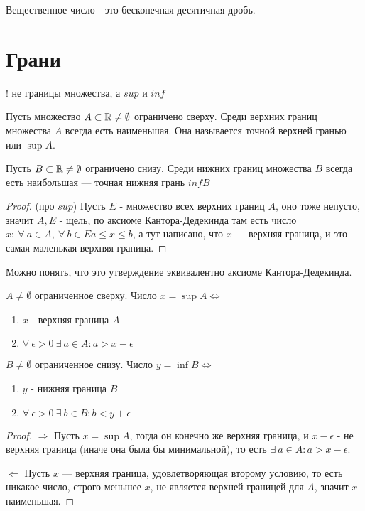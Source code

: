 \documentclass[12pt]{report}
\begin{document}
\begin{cor}
Вещественное число - это бесконечная десятичная дробь.
\end{cor}

\chapter{Грани}
! не границы множества, а $sup$ и $inf$

\begin{thm}
Пусть множество $A \subset \mathbb{R} \neq \emptyset$ ограничено сверху. Среди верхних границ множества $A$ всегда есть наименьшая. Она называется точной верхней гранью или $\sup{A}$.

Пусть $B \subset \mathbb{R} \neq \emptyset$ ограничено снизу. Среди нижних границ множества $B$ всегда есть наибольшая --- точная нижняя грань $inf{B}$
\end{thm}
\begin{proof}
(про $sup$) Пусть $E$  - множество всех верхних границ $A$, оно тоже непусто, значит $A, E$ - щель, по аксиоме Кантора-Дедекинда там есть число $x: ~\forall ~a \in A, ~\forall ~b \in E a \le x \le b$, а тут написано, что $x$ --- верхняя граница, и это самая маленькая верхняя граница.
\end{proof}

\begin{rem}
Можно понять, что это утверждение эквивалентно аксиоме Кантора-Дедекинда.
\end{rem}

\begin{thm}
$A \neq \emptyset$ ограниченное сверху. Число $x = \sup{A} \Leftrightarrow$
\begin{enumerate}
\item $x$ - верхняя граница $A$
\item $\forall ~\epsilon > 0 ~\exists ~a \in A: a > x - \epsilon$
\end{enumerate}

$B \neq \emptyset$ ограниченное снизу. Число $y = \inf{B} \Leftrightarrow$
\begin{enumerate}
\item $y$ - нижняя граница $B$
\item $\forall ~\epsilon > 0 ~\exists ~b \in B: b < y + \epsilon$
\end{enumerate}
\end{thm}
\begin{proof}
$\Rightarrow$ Пусть $x = \sup{A}$, тогда он конечно же верхняя граница, и $x - \epsilon$ - не верхняя граница (иначе она была бы минимальной), то есть $\exists ~a \in A: a > x - \epsilon$.

$\Leftarrow$ Пусть $x$ --- верхняя граница, удовлетворяющая второму условию, то есть никакое число, строго меньшее $x$, не является верхней границей для $A$, значит $x$ наименьшая.
\end{proof}
\end{document}
